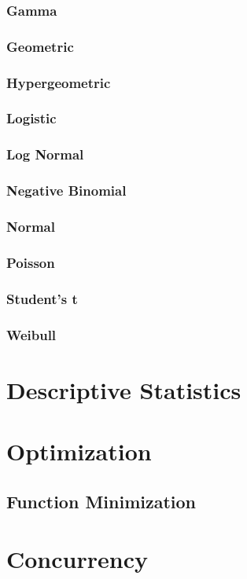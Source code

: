 \documentclass[12pt,a4paper]{article}
\begin{document}
\subsubsection{Gamma}
\subsubsection{Geometric}
\subsubsection{Hypergeometric}
\subsubsection{Logistic}
\subsubsection{Log Normal}
\subsubsection{Negative Binomial}
\subsubsection{Normal}
\subsubsection{Poisson}
\subsubsection{Student's t}
\subsubsection{Weibull}
\section{Descriptive Statistics}
\section{Optimization}
\subsection{Function Minimization}
\section{Concurrency}
\end{document}
